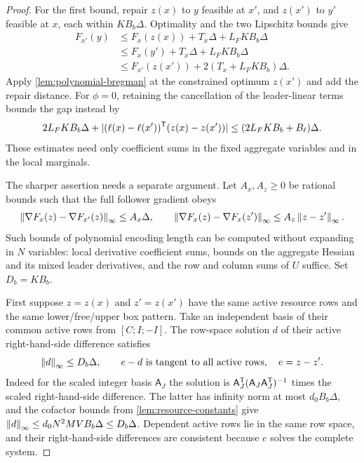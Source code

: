 \begin{proof}
For the first bound, repair $z(x)$ to $y$ feasible at $x'$, and
$z(x')$ to $y'$ feasible at $x$, each within $KB_b\Delta$.
Optimality and the two Lipschitz bounds give
\[
 \begin{split}
 F_{x'}(y)&\le F_x(z(x))+T_x\Delta+L_FKB_b\Delta\\
 &\le F_x(y')+T_x\Delta+L_FKB_b\Delta\\
 &\le F_{x'}(z(x'))+2(T_x+L_FKB_b)\Delta.
 \end{split}
\]
Apply \cref{lem:polynomial-bregman} at the constrained optimum
$z(x')$ and add the repair distance. For $\phi=0$, retaining the
cancellation of the leader-linear terms bounds the gap instead by
\[
 2L_FKB_b\Delta+
 |(\ell(x)-\ell(x'))^{\mathsf T}(z(x)-z(x'))|
                         \le(2L_FKB_b+B_\ell)\Delta.
\]
These estimates need only coefficient sums in the fixed aggregate
variables and in the local marginals.

The sharper assertion needs a separate argument. Let $A_x,A_z\ge0$ be
rational bounds such that the full follower gradient obeys
\[
 \left\lVert\nabla F_x(z)-\nabla F_{x'}(z)\right\rVert_\infty\le A_x\Delta,
 \qquad
 \left\lVert\nabla F_x(z)-\nabla F_x(z')\right\rVert_\infty\le A_z\left\lVert z-z'\right\rVert_\infty.
\]
Such bounds of polynomial encoding length can be computed without
expanding in $N$ variables: local derivative coefficient sums, bounds on
the aggregate Hessian and its mixed leader derivatives, and the row and
column sums of $U$ suffice. Set $D_b=KB_b$.

First suppose $z=z(x)$ and $z'=z(x')$ have the same active resource
rows and the same lower/free/upper box pattern. Take an independent
basis of their common active rows from $[C;I;-I]$. The row-space
solution $d$ of their active right-hand-side difference satisfies
\begin{equation}\label{eq:active-row-correction}
       \left\lVert d\right\rVert_\infty\le D_b\Delta,\qquad
               e-d\text{ is tangent to all active rows},\quad e=z-z'.
\end{equation}
Indeed for the scaled integer basis $\mathsf A_J$ the solution is
$\mathsf A_J^{\mathsf T}(\mathsf A_J\mathsf A_J^{\mathsf T})^{-1}$ times
the scaled right-hand-side difference. The latter has infinity norm
at most $d_0B_b\Delta$, and the cofactor bounds from
\cref{lem:resource-constants} give
$\left\lVert d\right\rVert_\infty\le d_0N^2MV B_b\Delta\le D_b\Delta$.
Dependent active rows lie in the same row space, and their
right-hand-side differences are consistent because $e$ solves the complete
system.


\end{proof}
